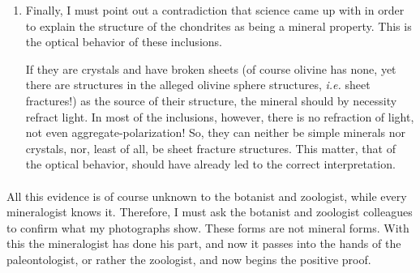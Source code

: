 \documentclass[a4paper, 12pt, oneside]{article}
\begin{document}
\begin{enumerate}
    Here the idea about the basic difference between meteoritic forms and crystallites is made quite clear.
    
    Crystallites always grow around one point (concentric). The forms in the meteorites are all elliptical and pear-shaped: if the outer form is also spherical, the alleged inclusions are eccentrically arranged and the center lies on the periphery (even beyond it, namely, it is ground away, which Gümbel overlooked) --- a phenomenon that never occurs in the mineral kingdom. It is precisely the condition of crystallites, \emph{i.e.} sphere formation, that crystals unite with a crystal of equal mass, which then create the concentric forms.
    
    Therefore, if the spheres in the meteorites were crystallites, then, at least according to the laws of Earth, concentric formations should show.
    \item Finally, I must point out a contradiction that science came up with in order to explain the structure of the chondrites as being a mineral property. This is the optical behavior of these inclusions.
    
    If they are crystals and have broken sheets (of course olivine has none, yet there are structures in the alleged olivine sphere structures, \emph{i.e.} sheet fractures!) as the source of their structure, the mineral should by necessity refract light. In most of the inclusions, however, there is no refraction of light, not even aggregate-polarization! So, they can neither be simple minerals nor crystals, nor, least of all, be sheet fracture structures. This matter, that of the optical behavior, should have already led to the correct interpretation.
\end{enumerate}
\paragraph*{}
All this evidence is of course unknown to the botanist and zoologist, while every mineralogist knows it. Therefore, I must ask the botanist and zoologist colleagues to confirm what my photographs show. These forms are not mineral forms. With this the mineralogist has done his part, and now it passes into the hands of the paleontologist, or rather the zoologist, and now begins the positive proof.
\clearpage
\subsection{}
\end{document}
